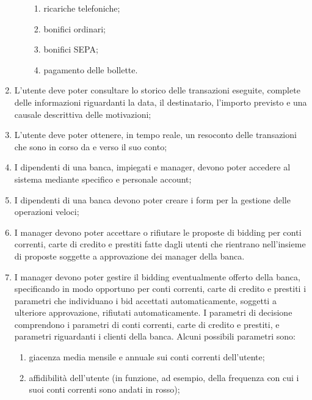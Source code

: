 \begin{enumerate}
\begin{enumerate}
			\begin{enumerate}
				\item ricariche telefoniche;
				\item bonifici ordinari;
				\item bonifici SEPA;
				\item pagamento delle bollette.
			\end{enumerate} 
	\end{enumerate}
	\item \label{itm:utente:funzionali:storico} L'utente deve poter consultare lo storico delle transazioni eseguite, complete delle informazioni riguardanti la data, il destinatario, l'importo previsto e una causale descrittiva delle motivazioni;
	\item \label{itm:utente:funzionali:resoconto} L'utente deve poter ottenere, in tempo reale, un resoconto delle transazioni che sono in corso da e verso il suo conto;
	\item \label{itm:utente:funzionali:dipendenti:accesso} I dipendenti di una banca, impiegati e manager, devono poter accedere al sistema mediante specifico e personale account;
	\item \label{itm:utente:funzionali:dipendenti:operazioni-veloci} I dipendenti di una banca devono poter creare i form per la gestione delle operazioni veloci;
	\item \label{itm:utente:funzionali:management:bidding:approvazione} I manager devono poter accettare o rifiutare le proposte di bidding per conti correnti, carte di credito e prestiti fatte dagli utenti che rientrano nell'insieme di proposte soggette a approvazione dei manager della banca.
	\item \label{itm:utente:funzionali:management:bidding:creazione} I manager devono poter gestire il bidding eventualmente offerto della banca, specificando in modo opportuno per conti correnti, carte di credito e prestiti i parametri che individuano i bid accettati automaticamente, soggetti a ulteriore approvazione, rifiutati automaticamente.
	I parametri di decisione comprendono i parametri di conti correnti, carte di credito e prestiti, e parametri riguardanti i clienti della banca.
	Alcuni possibili parametri sono:
		\begin{enumerate}
			\item giacenza media mensile e annuale sui conti correnti dell'utente;
			\item affidibilit\`a dell'utente (in funzione, ad esempio, della frequenza con cui i suoi conti correnti sono andati in rosso);

\end{enumerate}
\end{enumerate}
